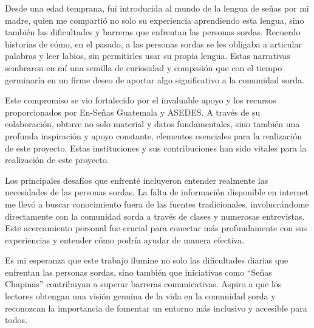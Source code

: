 Desde una edad temprana, fui introducida al mundo de la lengua de señas por mi madre, quien me compartió no solo su experiencia aprendiendo esta lengua, sino también las dificultades y barreras que enfrentan las personas sordas. Recuerdo historias de cómo, en el pasado, a las personas sordas se les obligaba a articular palabras y leer labios, sin permitirles usar su propia lengua. Estas narrativas sembraron en mí una semilla de curiosidad y compasión que con el tiempo germinaría en un firme deseo de aportar algo significativo a la comunidad sorda.

Este compromiso se vio fortalecido por el invaluable apoyo y los recursos proporcionados por En-Señas Guatemala y ASEDES. A través de su colaboración, obtuve no solo material y datos fundamentales, sino también una profunda inspiración y apoyo constante, elementos esenciales para la realización de este proyecto. Estas instituciones y sus contribuciones han sido vitales para la realización de este proyecto.

Los principales desafíos que enfrenté incluyeron entender realmente las necesidades de las personas sordas. La falta de información disponible en internet me llevó a buscar conocimiento fuera de las fuentes tradicionales, involucrándome directamente con la comunidad sorda a través de clases y numerosas entrevistas. Este acercamiento personal fue crucial para conectar más profundamente con sus experiencias y entender cómo podría ayudar de manera efectiva.

Es mi esperanza que este trabajo ilumine no solo las dificultades diarias que enfrentan las personas sordas, sino también que iniciativas como ``Señas Chapinas'' contribuyan a superar barreras comunicativas. Aspiro a que los lectores obtengan una visión genuina de la vida en la comunidad sorda y reconozcan la importancia de fomentar un entorno más inclusivo y accesible para todos.


